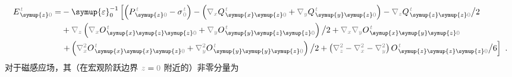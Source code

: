 \begin{subequations}
\begin{align}
	E^{\;\!\mathcolor{gray}{t}}_{\;\! \symup{z} \mathcolor{gray}{0}} = &- {\symup{\varepsilon}}_0^{-1} \left[ \left( P^{\;\!\mathcolor{gray}{t}}_{\;\! \symup{z} \mathcolor{gray}{0}} - {\sigma}^{\;\!\mathcolor{gray}{t}}_{\;\! \mathcolor{gray}{0}} \right) - \left( \mathcolor{gray}{\nabla_x} Q^{\;\!\mathcolor{gray}{t}}_{\;\! \symup{x} \symup{z} \mathcolor{gray}{0}} + \mathcolor{gray}{\nabla_y} Q^{\;\!\mathcolor{gray}{t}}_{\;\! \symup{y} \symup{z} \mathcolor{gray}{0}} \right) - \mathcolor{gray}{\nabla_z} Q^{\;\!\mathcolor{gray}{t}}_{\;\! \symup{z} \symup{z} \mathcolor{gray}{0}} \big/ 2 \right. \label{eq:E_z0==} \\ & + \mathcolor{gray}{\nabla_z} \left( \mathcolor{gray}{\nabla_x} O^{\;\!\mathcolor{gray}{t}}_{\;\! \symup{x} \symup{z} \symup{z} \mathcolor{gray}{0}} + \mathcolor{gray}{\nabla_y} O^{\;\!\mathcolor{gray}{t}}_{\;\! \symup{y} \symup{z} \symup{z} \mathcolor{gray}{0}} \right) \big/ 2 + \mathcolor{gray}{\nabla_x} \mathcolor{gray}{\nabla_y} O^{\;\!\mathcolor{gray}{t}}_{\;\! \symup{x} \symup{y} \symup{z} \mathcolor{gray}{0}} \\ & \left. + \left( \mathcolor{gray}{\nabla_x^2} O^{\;\!\mathcolor{gray}{t}}_{\;\! \symup{x} \symup{x} \symup{z} \mathcolor{gray}{0}} + \mathcolor{gray}{\nabla_y^2} O^{\;\!\mathcolor{gray}{t}}_{\;\! \symup{y} \symup{y} \symup{z} \mathcolor{gray}{0}} \right) \big/ 2 + \left( \mathcolor{gray}{\nabla_z^2} - \mathcolor{gray}{\nabla_x^2} - \mathcolor{gray}{\nabla_y^2} \right) O^{\;\!\mathcolor{gray}{t}}_{\;\! \symup{z} \symup{z} \symup{z} \mathcolor{gray}{0}} \big/ 6 \right] ~.
\end{align}
\end{subequations}
对于磁感应场，其（在宏观阶跃边界 $\mathcolor{gray}{z \mathcolor{black}{=} 0}$ 附近的）非零分量为
